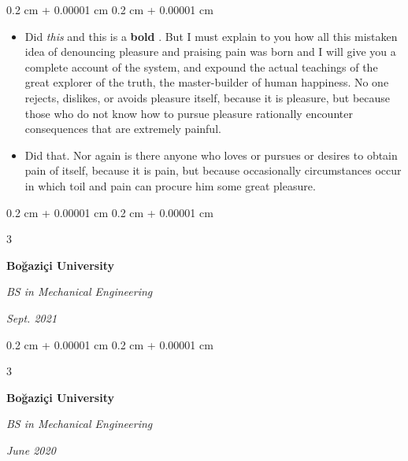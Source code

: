 \documentclass[10pt, letterpaper]{article}
\newenvironment{highlights}{
    \begin{itemize}[
        topsep=0.10 cm,
        parsep=0.10 cm,
        partopsep=0pt,
        itemsep=0pt,
        leftmargin=0.4 cm + 10pt + 0.6 cm
    ]
}{
    \end{itemize}
} %
\newenvironment{onecolentry}{
    \begin{adjustwidth}{
        0.2 cm + 0.00001 cm
    }{
        0.2 cm + 0.00001 cm
    }
}{
    \end{adjustwidth}
} %
\newenvironment{threecolentry}[3][]{
    \onecolentry
    \def\thirdColumn{#3}
    \setcolumnwidth{0.6 cm, \fill, 4.5 cm}
    \begin{paracol}{3}
    #2 \switchcolumn
}{
    \switchcolumn \raggedleft \thirdColumn
    \end{paracol}
    \endonecolentry
} %
\let\hrefWithoutArrow\href
\renewcommand{\href}[2]{\hrefWithoutArrow{#1}{\mbox{\ifthenelse{\equal{#2}{}}{ }{#2 }\raisebox{.15ex}{\footnotesize \faExternalLink*}}}}
\begin{document}
        \vspace{0.10 cm-3px}
        \begin{onecolentry}
            \begin{highlights}
                \item Did \textit{this} and this is a \textbf{bold} \href{https://example.com}{link}. But I must explain to you how all this mistaken idea of denouncing pleasure and praising pain was born and I will give you a complete account of the system, and expound the actual teachings of the great explorer of the truth, the master-builder of human happiness. No one rejects, dislikes, or avoids pleasure itself, because it is pleasure, but because those who do not know how to pursue pleasure rationally encounter consequences that are extremely painful.
                \item Did that. Nor again is there anyone who loves or pursues or desires to obtain pain of itself, because it is pain, but because occasionally circumstances occur in which toil and pain can procure him some great pleasure.
            \end{highlights}
        \end{onecolentry}


        \vspace{0.2 cm-3px}

        \begin{threecolentry}{
            \vspace*{\fill}
            \textbullet
            \vspace*{3px}
            \vspace*{\fill}
        }{
            
            
        \textit{Sept. 2021}}
            \textbf{Boğaziçi University}

            \textit{BS in Mechanical Engineering}
        \end{threecolentry}



        \vspace{0.2 cm-3px}

        \begin{threecolentry}{
            \vspace*{\fill}
            \textbullet
            \vspace*{3px}
            \vspace*{\fill}
        }{
            
            
        \textit{June 2020}}
            \textbf{Boğaziçi University}

            \textit{BS in Mechanical Engineering}
        \end{threecolentry}
\end{document}
